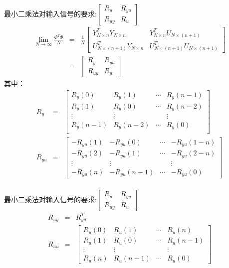 \begin{frame}{最小二乘法对输入信号的要求:$\begin{bmatrix}R_y & R_{yu} \\ R_{uy} & R_{u}\end{bmatrix}$}
\begin{eqnarray*}
\lim_{N\rightarrow\infty}\frac{\Phi^T\Phi}{N} &=& 
\frac{1}{N}
\begin{bmatrix}
Y_{N \times n}^T Y_{N\times n}  & Y_{N \times n}^T U_{N\times(n+1)}  \\
U_{N\times(n+1)}^T Y_{N\times n}  &  U_{N\times(n+1)}^T U_{N\times(n+1)} 
\end{bmatrix}\\
&=& \begin{bmatrix} R_y & R_{yu} \\ R_{uy} & R_u\end{bmatrix}
\end{eqnarray*}
其中：
\begin{eqnarray*}
R_y &=& 
\begin{bmatrix}
R_y(0) & R_y(1) & \cdots & R_y(n-1) \\
R_y(1) & R_y(0) & \cdots & R_y(n-2) \\
\vdots & \vdots &        & \vdots   \\
R_y(n-1) & R_y(n-2) & \cdots & R_y(0) \\
\end{bmatrix}\\
R_{yu} &=&
\begin{bmatrix}
-R_{yu}(1) & -R_{yu}(0) & \cdots & -R_{yu}(1-n) \\
-R_{yu}(2) & -R_{yu}(1) & \cdots & -R_{yu}(2-n) \\
\vdots     & \vdots     &        &\vdots \\
-R_{yu}(n) & -R_{yu}(n-1) & \cdots & -R_{yu}(0) 
\end{bmatrix} \\
\end{eqnarray*}
\end{frame}

\begin{frame}{最小二乘法对输入信号的要求:$\begin{bmatrix}R_y & R_{yu} \\ R_{uy} & R_{u}\end{bmatrix}$}
\begin{eqnarray*}
R_{uy} &=& R_{yu}^T \\
R_{uu} &=&
\begin{bmatrix}
R_u(0) & R_u(1) & \cdots & R_u(n) \\
R_u(1) & R_u(0) & \cdots & R_u(n-1) \\
\vdots     & \vdots     &        &\vdots \\
R_u(n) & R_u(n-1) & \cdots & R_u(0)
\end{bmatrix}
\end{eqnarray*}


\end{frame}

